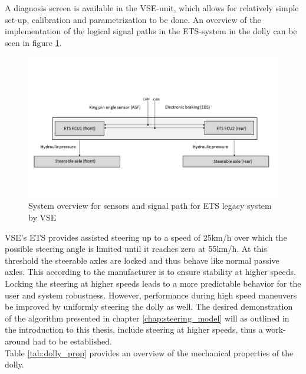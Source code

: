 \documentclass[ExampleMasters.tex]{subfiles}
\begin{document}
 A diagnosis screen is available in the \gls{VSE}-unit, which allows for relatively simple set-up, calibration and parametrization to be done\cite{dolly_datasheet}. An overview of the implementation of the logical signal paths in the \gls{ETS}-system in the dolly can be seen in figure \ref{fig:system_overview_ETS}. 
\begin{figure}[!htb]
	\centering
	\includegraphics[width=1\linewidth]{figures/system_overview_ETS}
	\caption[System overview for sensors and signal path for \acrlong{ETS} legacy system by VSE]{System overview for sensors and signal path for \acrlong{ETS} legacy system by \gls{VSE}}
	\label{fig:system_overview_ETS}
\end{figure}


\gls{VSE}'s \gls{ETS} provides assisted steering up to a speed of 25km/h over which the possible steering angle is limited until it reaches zero at 55km/h. At this threshold the steerable axles are locked and thus behave like normal passive axles. This according to the manufacturer is to ensure stability at higher speeds\cite{dolly_datasheet}. Locking the steering at higher speeds leads to a more predictable behavior for the user and system robustness. However, performance during high speed maneuvers be improved by uniformly steering the dolly as well\cite{performance_improvement}. The desired demonstration of the algorithm presented in chapter \ref{chap:steering_model} will as outlined in the introduction to this thesis, include steering at higher speeds, thus a work-around had to be established.\\
Table \ref{tab:dolly_prop} provides an overview of the mechanical properties of the dolly.
\end{document}
